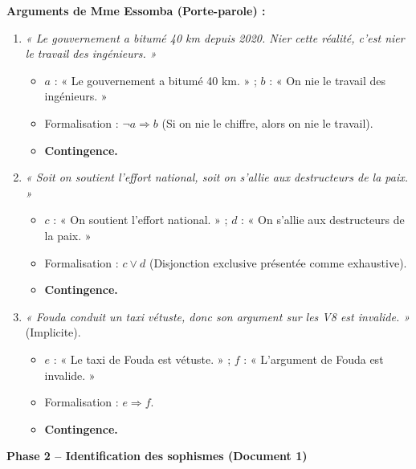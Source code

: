 \documentclass[11pt]{article}
\begin{document}
\begin{exoresolu}
\noindent\textbf{Arguments de Mme Essomba (Porte-parole) :}
\begin{enumerate}
    \item \emph{« Le gouvernement a bitumé 40 km depuis 2020. Nier cette réalité, c'est nier le travail des ingénieurs. »}
    \begin{itemize}
        \item $a$ : « Le gouvernement a bitumé 40 km. » ; $b$ : « On nie le travail des ingénieurs. »
        \item Formalisation : $\neg a \Rightarrow b$ (Si on nie le chiffre, alors on nie le travail).
        \item \textbf{Contingence.}
    \end{itemize}
    \item \emph{« Soit on soutient l'effort national, soit on s'allie aux destructeurs de la paix. »}
    \begin{itemize}
        \item $c$ : « On soutient l'effort national. » ; $d$ : « On s'allie aux destructeurs de la paix. »
        \item Formalisation : $c \lor d$ (Disjonction exclusive présentée comme exhaustive).
        \item \textbf{Contingence.}
    \end{itemize}
    \item \emph{« Fouda conduit un taxi vétuste, donc son argument sur les V8 est invalide. »} (Implicite).
    \begin{itemize}
        \item $e$ : « Le taxi de Fouda est vétuste. » ; $f$ : « L'argument de Fouda est invalide. »
        \item Formalisation : $e \Rightarrow f$.
        \item \textbf{Contingence.}
    \end{itemize}
\end{enumerate}

\medskip
\noindent\textbf{Phase 2 -- Identification des sophismes (Document 1)}


\end{exoresolu}
\end{document}
